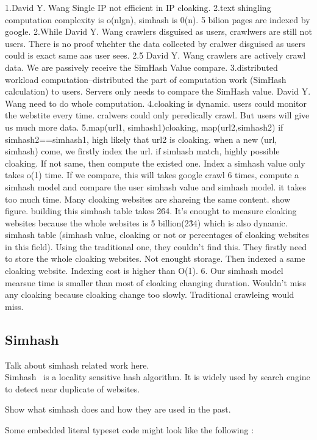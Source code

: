 1.David Y. Wang Single IP not efficient in  IP cloaking.
2.text shingling computation complexity is o(nlgn), simhash is 0(n). 5 bilion pages are indexed by google. 
2.While David Y. Wang crawlers disguised as users, crawlwers are still not users. There is no proof whehter the data collected by cralwer disguised as users could is exact same aas user sees. 
2.5 David Y. Wang crawlers are actively crawl data. We are passively receive the SimHash Value compare. 
3.distributed workload computation--distributed the part of computation work (SimHash calculation) to users. Servers only needs to compare the SimHash value. David Y. Wang need to do whole computation. 
4.cloaking is dynamic. users could monitor the webstite every time. cralwers could only peredically crawl. But users will give us much more data.
5.map(url1, simhash1)cloaking,  map(url2,simhash2) if simhash2==simhash1, high likely that url2 is cloaking. when a new (url, simhash) come, we firstly index the url. if simhash match, highly possible
cloaking. If not same, then compute the existed one. Index a simhash value only takes o(1) time. If we compare, this will takes google crawl 6 times, compute a simhash model and compare the user 
simhash value and simhash model. it takes too much time. Many cloaking websites
are shareing the same content. show figure. \XXX{} building this simhash table
takes 2\^64. It's enought to measure 
cloaking websites because the whole websites is 5 billion(2\^34) which is also dynamic. simhash table (simhash value, cloaking or not or percentages of cloaking websites in this field). Using the traditional one, they couldn't find this. They firstly need to store the whole cloaking websites. Not enought storage. Then indexed a same cloaking website. Indexing cost is higher than O(1). 
6. Our simhash model mearsue time is smaller than most of cloaking changing duration. Wouldn't miss any cloaking because cloaking change too slowly. Traditional crawleing would miss. 
\subsection{Simhash}
Talk about simhash related work here. \\
Simhash~\cite{charikar2002similarity}  is a locality sensitive hash algorithm.
It is widely used by search engine to detect near duplicate of websites.


Show what simhash does and how they are used in the past.

Some embedded literal typeset code might 
look like the following :

